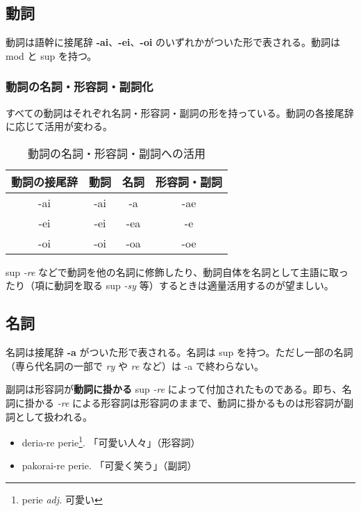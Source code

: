 \clearpage

\subsection{動詞}

動詞は語幹に接尾辞 \textbf{-ai}、\textbf{-ei}、\textbf{-oi} のいずれかがついた形で表される。動詞は mod と sup を持つ。

\subsubsection{動詞の名詞・形容詞・副詞化}

すべての動詞はそれぞれ名詞・形容詞・副詞の形を持っている。動詞の各接尾辞に応じて活用が変わる。

\begin{table}[h]
    \centering
    \caption{動詞の名詞・形容詞・副詞への活用}
    \begin{tabular}{cccc}
        \hline
        動詞の接尾辞 & 動詞 & 名詞 & 形容詞・副詞 \\
        \hline \hline
        -ai & -ai & -a  & -ae \\
        -ei & -ei & -ea & -e  \\
        -oi & -oi & -oa & -oe \\
        \hline
    \end{tabular}
\end{table}

sup \emph{-re} などで動詞を他の名詞に修飾したり、動詞自体を名詞として主語に取ったり（項に動詞を取る sup \emph{-sy} 等）するときは適量活用するのが望ましい。

\subsection{名詞}

名詞は接尾辞 \textbf{-a} がついた形で表される。名詞は sup を持つ。ただし一部の名詞（専ら代名詞の一部で \emph{ry} や \emph{re} など）は -a で終わらない。

副詞は形容詞が\textbf{動詞に掛かる} sup \emph{-re} によって付加されたものである。即ち、名詞に掛かる \emph{-re} による形容詞は形容詞のままで、動詞に掛かるものは形容詞が副詞として扱われる。

\begin{itemize}
    \item deria-re perie\footnote{perie \emph{adj.} 可愛い}. 「可愛い人々」（形容詞）
    \item pakorai-re perie. 「可愛く笑う」（副詞）
\end{itemize}

